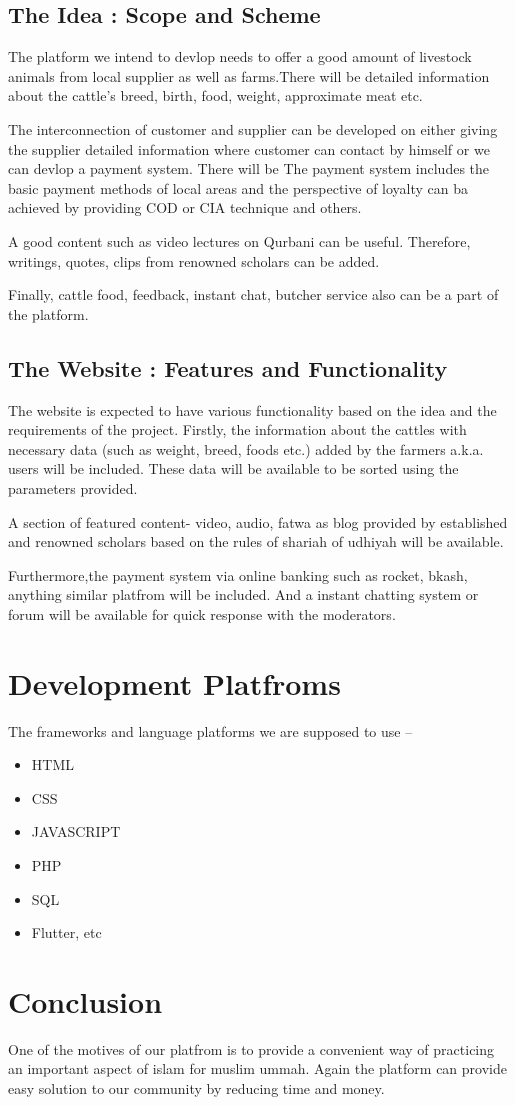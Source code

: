 \documentclass[a4paper,12pt]{report}
\begin{document}
\subsection*{The Idea : Scope and Scheme}
The platform we intend to devlop needs to offer a good amount of  livestock animals from local supplier as well as farms.There will be detailed information about the cattle's breed, birth, food, weight, approximate meat etc.

The interconnection of customer and supplier can be developed on either giving the supplier detailed information where customer can contact by himself or we can devlop a payment system.
There will be
The payment system includes the basic payment methods of local areas and the perspective of loyalty can ba achieved by providing COD or CIA technique and others.

A good content such as video lectures on Qurbani can be useful. Therefore, writings, quotes, clips from renowned scholars can be added.

Finally, cattle food, feedback, instant chat, butcher service also can be a part of the platform.

\subsection*{The Website : Features and Functionality}

The website is expected to have various functionality based on the idea and the requirements of the project. Firstly, the information about the cattles with necessary data (such as weight, breed, foods etc.) added by the farmers a.k.a. users will be included. These data will be available to be sorted using the parameters provided.

A section of featured content- video, audio, fatwa as blog provided by established and renowned scholars based on the rules of shariah of udhiyah will be available.

Furthermore,the payment system via online banking such as rocket, bkash, anything similar platfrom will be included. And a instant chatting system or forum will be available for quick response with the moderators.

\section*{Development Platfroms}
The frameworks and language platforms we are supposed to use --
\begin{itemize}
	\item HTML
	\item CSS
	\item JAVASCRIPT
	\item PHP
	\item SQL
\item Flutter, etc
\end{itemize}

\section*{Conclusion}
One of the motives of our platfrom is to provide a convenient way of practicing an important aspect of islam for muslim ummah. Again the platform can provide easy solution to our community by reducing time and money.
\end{document}
